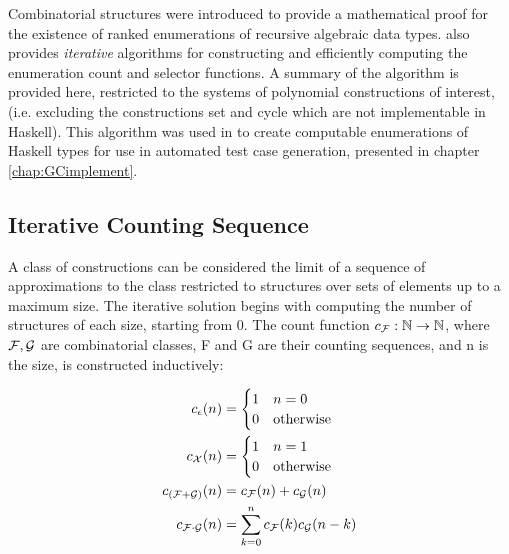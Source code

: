 
Combinatorial structures were introduced to provide 
a mathematical proof for the existence of 
ranked enumerations of recursive algebraic data types.
\cite{FlajoletZC94} also provides \emph{iterative} algorithms 
for constructing and efficiently computing 
the enumeration count and selector functions.
A summary of the algorithm is provided here,
restricted to the systems of polynomial constructions of interest,
(i.e. excluding the constructions set and cycle
which are not implementable in Haskell).
This algorithm was used in \GC to create computable enumerations of Haskell types
for use in automated test case generation,
presented in chapter \ref{chap:GCimplement}.

\subsection{Iterative Counting Sequence}

A class of constructions can be considered 
the limit of a sequence of approximations to the class
restricted to structures over sets of elements up to a maximum size.
The iterative solution begins with computing the number of structures of each size, starting from $0$.
The count function $c_{\mathcal{F}} : \mathbb{N} \rightarrow \mathbb{N}$,
where $\mathcal{F}, \mathcal{G}$ are combinatorial classes,
F and G are their counting sequences, 
and n is the size, is constructed inductively:

\begin{equation}
\begin{aligned}
c_{\epsilon}(n) & =  \begin{cases} 1 & n = 0  \\  0 & \text{otherwise}   \end{cases} \\
c_{\mathcal{X}}(n)  & =  \begin{cases} 1 & n = 1  \\  0 & \text{otherwise}   \end{cases} \\
c_{(\mathcal{F} + \mathcal{G})}(n) & =  c_{\mathcal{F}}(n) +  c_{\mathcal{G}}(n)\\
c_{\mathcal{F} \cdot \mathcal{G}}(n) & = \sum_{k=0}^{n} c_{\mathcal{F}}(k)  c_{\mathcal{G}}(n-k)
\end{aligned}
\end{equation}

